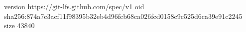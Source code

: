 version https://git-lfs.github.com/spec/v1
oid sha256:874a7c3acf11f98395b32eb4d96fcb68ca026fcd0158c9c525d6ca39e91c2245
size 43840
